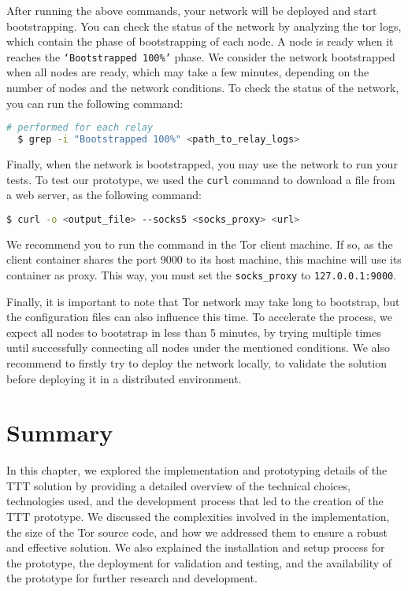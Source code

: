 After running the above commands, your network will be deployed and start bootstrapping. You can check the status of the network by analyzing the tor logs, which contain the phase of bootstrapping of each node. A node is ready when it reaches the \texttt{`Bootstrapped 100\%'} phase. We consider the network bootstrapped when all nodes are ready, which may take a few minutes, depending on the number of nodes and the network conditions. To check the status of the network, you can run the following command:
\begin{lstlisting}[language=bash]
  # performed for each relay
  $ grep -i "Bootstrapped 100%" <path_to_relay_logs> 
\end{lstlisting}

Finally, when the network is bootstrapped, you may use the network to run your tests. To test our prototype, we used the \texttt{curl} command to download a file from a web server, as the following command:
\begin{lstlisting}[language=bash]
  $ curl -o <output_file> --socks5 <socks_proxy> <url>
\end{lstlisting}

We recommend you to run the command in the Tor client machine. If so, as the client container shares the port 9000 to its host machine, this machine will use its container as proxy. This way, you must set the \texttt{socks\_proxy} to \texttt{127.0.0.1:9000}.

Finally, it is important to note that Tor network may take long to bootstrap, but the configuration files can also influence this time. To accelerate the process, we expect all nodes to bootstrap in less than 5 minutes, by trying multiple times until successfully connecting all nodes under the mentioned conditions. We also recommend to firstly try to deploy the network locally, to validate the solution before deploying it in a distributed environment. 

\section{Summary}\label{sec:implementation_summary}
In this chapter, we explored the implementation and prototyping details of the TTT solution by providing a detailed overview of the technical choices, technologies used, and the development process that led to the creation of the TTT prototype. We discussed the complexities involved in the implementation, the size of the Tor source code, and how we addressed them to ensure a robust and effective solution. We also explained the installation and setup process for the prototype, the deployment for validation and testing, and the availability of the prototype for further research and development.